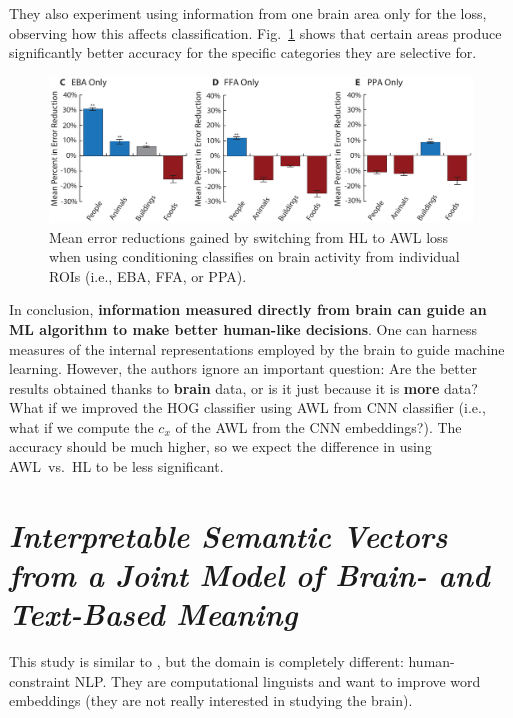 They also experiment using information from one brain area only for the loss, observing how this affects classification. Fig.~\ref{fig:fong_2} shows that certain areas produce significantly better accuracy for the specific categories they are selective for.\\

\begin{figure}[!ht]
    \centering
    \captionsetup{width=.8\linewidth}
    \includegraphics[width=0.7\linewidth]{images/fong_2.png}
    \caption{Mean error reductions gained by switching from HL to AWL loss when using conditioning classifies on brain activity from individual ROIs (i.e., EBA, FFA, or PPA).}
    \label{fig:fong_2}
\end{figure}

In conclusion, \textbf{information measured directly from brain can guide an ML algorithm to make better human-like decisions}.
One can harness measures of the internal representations employed by the brain to guide machine learning.
However, the authors ignore an important question: Are the better results obtained thanks to \textbf{brain} data, or is it just because it is \textbf{more} data? What if we improved the HOG classifier using AWL from CNN classifier (i.e., what if we compute the $c_x$ of the AWL from the CNN embeddings?).
The accuracy should be much higher, so we expect the difference in using AWL~vs.~HL to be less significant.

\section[Interpretable semantic vectors from a joint model of brain- and text-based meaning]{\textit{Interpretable Semantic Vectors from a Joint Model of Brain- and Text-Based Meaning}\\ }

This study is similar to \cite{fong2017using}, but the domain is completely different: human-constraint NLP. They are computational linguists and want to improve word embeddings (they are not really interested in studying the brain).

